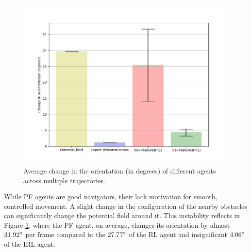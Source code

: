 \begin{figure}[htbp]
    \centering
    \includegraphics[width=0.7\linewidth]{plots/plot_without_outliers/ucy_inter_method_no_outlier/compute_trajectory_smoothness_ucy_no_outlier_inter_method.png}
    \caption{Average change in the orientation (in degrees) of different agents across multiple trajectories.}
    \label{fig:inter_method-change_in_orientation_avg}
\end{figure}
While PF agents are good navigators, their lack motivation for smooth, controlled movement. A slight change in the configuration of the nearby obstacles can significantly change the potential field around it. This instability reflects in Figure \ref{fig:inter_method-change_in_orientation_avg}, where the PF agent, on average, changes its orientation by almost $31.92\degree$ per frame compared to the $27.77\degree$ of the RL agent and insignificant $4.06\degree$ of the IRL agent.



